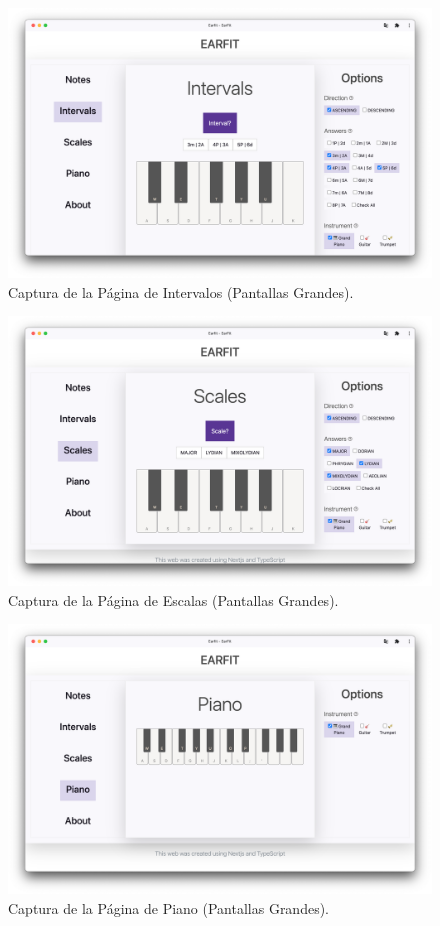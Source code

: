 \documentclass[12pt,twoside,titlepage]{report}
\begin{document}
{\begin{figure}[H]
    \centering
    \includegraphics[scale=0.28]{Capturas Earfit/PC/Intervals}
    \caption{Captura de la Página de Intervalos (Pantallas Grandes).}
    \label{fig:PCIntervals}
\end{figure}

\begin{figure}[H]
    \centering
    \includegraphics[scale=0.28]{Capturas Earfit/PC/Scales}
    \caption{Captura de la Página de Escalas (Pantallas Grandes).}
    \label{fig:PCScales}
\end{figure}

\begin{figure}[H]
    \centering
    \includegraphics[scale=0.28]{Capturas Earfit/PC/Piano}
    \caption{Captura de la Página de Piano (Pantallas Grandes).}
    \label{fig:PCPiano}
\end{figure}

}
\end{document}
